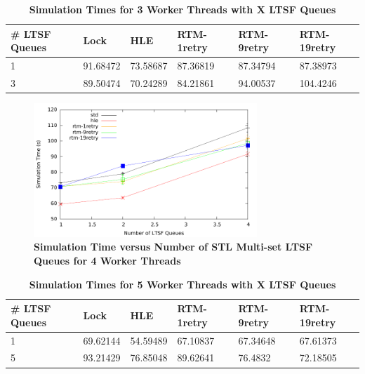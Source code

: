 \documentclass[11pt]{book}
\begin{document}
\begin{table}
    \centering
    \begin{tabular}{l|p{2cm}|p{2cm}|p{2cm}|p{2cm}|p{2cm}}
        \textbf{\# LTSF Queues}&Lock &HLE &RTM-1retry &RTM-9retry &RTM-19retry \\
        \hline
        \midrule
            1 &91.68472 &73.58687 &87.36819 &87.34794 &87.38973 \\ 
            3 &89.50474 &70.24289 &84.21861 &94.00537 &104.4246 \\
    \end{tabular}
    \caption{\textbf{Simulation Times for 3 Worker Threads with X LTSF Queues}}
    \label{tab:noThrMig_3threadsXschq}
\end{table}

\begin{figure}
    \centering
    \graphicspath{ {./figures/} }
    \includegraphics[width=0.75\textwidth,keepaspectratio]{hugeepidemicsim-NOmig-timeVSschedQs-multiset-4thread}
    \caption{\textbf{Simulation Time versus Number of STL Multi-set LTSF Queues for 4
        Worker Threads}}\label{fig:noThrMig_timeVSschq_4threads}
\end{figure}

\begin{table}
    \centering
    \begin{tabular}{l|p{2cm}|p{2cm}|p{2cm}|p{2cm}|p{2cm}}
        \textbf{\# LTSF Queues}&Lock &HLE &RTM-1retry &RTM-9retry &RTM-19retry \\
        \hline
        \midrule
            1 &69.62144  &54.59489 &67.10837 &67.34648 &67.61373\\ 
            5 &93.21429  &76.85048 &89.62641 &76.4832  &72.18505\\
    \end{tabular}
    \caption{\textbf{Simulation Times for 5 Worker Threads with X LTSF
        Queues}}\label{tab:noThrMig_5threadsXschq}
\end{table}
\end{document}
